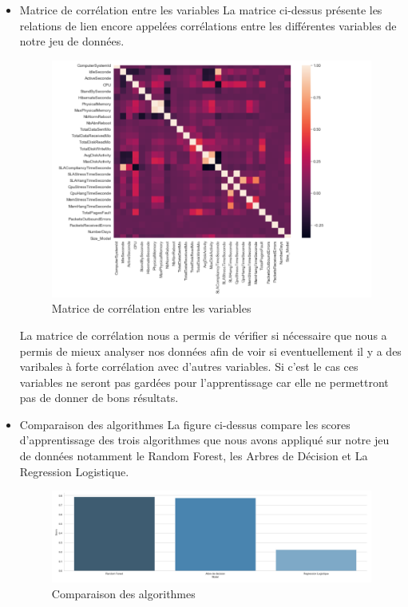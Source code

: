 \begin{itemize}[label=\textbullet, font=\LARGE \color{black}]
\newpage
\item Matrice de corrélation entre les variables
\newline
La matrice ci-dessus présente les relations de lien encore appelées corrélations entre les différentes variables  de notre jeu de données.
\begin{figure}[h]
\begin{center}
\includegraphics[scale=0.90]{Matrice_correlation.png}
\caption[Matrice de corrélation entre les variables]{Matrice de corrélation entre les variables}
\label{monlabel}
\end{center}
\end{figure}
\newline
La matrice de corrélation nous a permis de vérifier si nécessaire que nous a permis de mieux analyser nos données afin de voir si eventuellement il y a des varibales à forte corrélation avec d'autres variables. Si c'est le cas ces variables ne seront pas gardées pour l'apprentissage car elle ne permettront pas de donner de bons résultats.

\newpage
\item Comparaison des algorithmes
\newline
La figure ci-dessus compare les scores d'apprentissage des trois algorithmes que nous avons appliqué sur notre jeu de données notamment le Random Forest, les Arbres de Décision et La Regression Logistique.
\begin{figure}[h]
\begin{center}
\includegraphics[scale=0.70]{Resultats_scoring.png}
\caption[Comparaison des algorithmes]{Comparaison des algorithmes}
\label{monlabel}
\end{center}
\end{figure}
\end{itemize}
